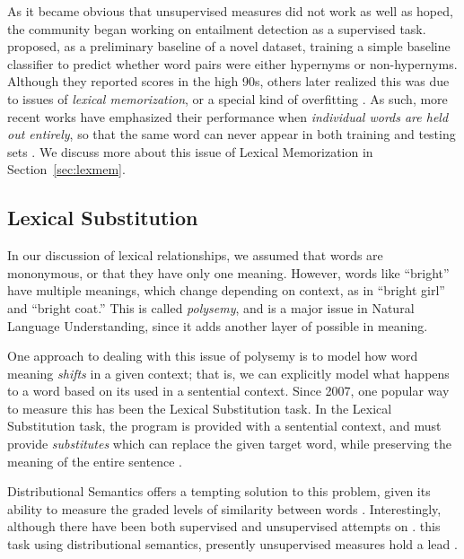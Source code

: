 \documentclass[12pt]{article}
\begin{document}
As it became obvious that unsupervised measures did not work as
well as hoped, the community began working on entailment detection as a
supervised task.  proposed, as a preliminary baseline
of a novel dataset, training a simple baseline classifier to predict whether
word pairs were either hypernyms or non-hypernyms. Although they reported scores
in the high 90s, others later realized this was due to issues of {\em lexical
memorization}, or a special kind of overfitting
\cite{roller:2014:coling,weeds:2014:coling,levy:2015:naacl}. As such, more
recent works have emphasized their performance when {\em individual words are
held out entirely}, so that the same word can never appear in both training and
testing sets
\cite{roller:2014:coling,kruszewski:2015:tacl,levy:2015:naacl,shwartz:2016:acl,roller:2016:naacl}.
We discuss more about this issue of Lexical Memorization in
Section~\ref{sec:lexmem}.

\subsection{Lexical Substitution}
\label{sec:lexsub}

In our discussion of lexical relationships, we assumed that words are
mononymous, or that they have only one meaning. However, words like ``bright''
have multiple meanings, which change depending on context, as in ``bright
girl'' and ``bright coat.'' This is called {\em polysemy}, and is a major issue
in Natural Language Understanding, since it adds another layer of possible in
meaning.

One approach to dealing with this issue of polysemy is to model how word
meaning {\em shifts} in a given context; that is, we can explicitly model what
happens to a word based on its used in a sentential context. Since 2007, one
popular way to measure this has been the Lexical Substitution task.  In the
Lexical Substitution task, the program is provided with a sentential context,
and must provide {\em substitutes} which can replace the given target word,
while preserving the meaning of the entire sentence
\cite{mccarthy:2007:semeval,biemann:2012:lrec,kremer:2014:eacl}.

Distributional Semantics offers a tempting solution to this problem, given its
ability to measure the graded levels of similarity between words
\cite{erk:2008:emnlp}. Interestingly, although there have been both supervised
\cite{biemann:2012:lrec,szarvas:2013:naacl} and unsupervised attempts on
\cite{erk:2008:emnlp,dinu:2010:emnlp,thater:2010:acl,vandecruys:2011:emnlp,kremer:2014:eacl,melamud:2015:naacl,melamud:2015:vsm,kawakami:2016:iclr,roller:2016:naacl}.
this task using distributional semantics, presently unsupervised measures hold
a lead \cite{melamud:2015:naacl,melamud:2016:conll}.
\end{document}
